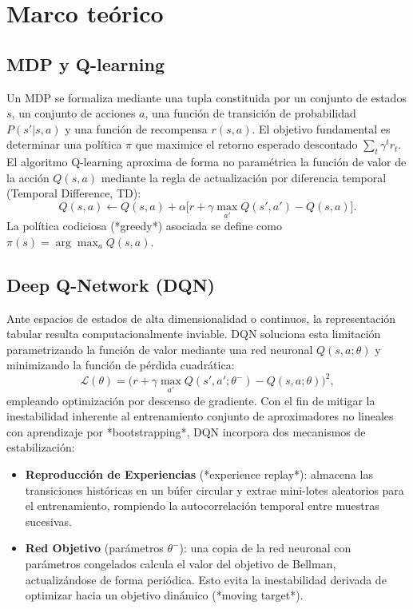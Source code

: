 \section{Marco teórico}
\label{sec:teoria}

\subsection{MDP y Q-learning}
Un MDP se formaliza mediante una tupla constituida por un conjunto de estados $s$, un conjunto de acciones $a$, una función de transición de probabilidad $P(s'|s,a)$ y una función de recompensa $r(s,a)$. El objetivo fundamental es determinar una política $\pi$ que maximice el retorno esperado descontado $\sum_t \gamma^t r_t$. El algoritmo Q-learning aproxima de forma no paramétrica la función de valor de la acción $Q(s,a)$ mediante la regla de actualización por diferencia temporal (Temporal Difference, TD):
\begin{equation}
Q(s,a) \leftarrow Q(s,a) + \alpha\big[r + \gamma \max_{a'} Q(s',a') - Q(s,a)\big].
\end{equation}
La política codiciosa (*greedy*) asociada se define como $\pi(s)=\arg\max_a Q(s,a)$.

\subsection{Deep Q-Network (DQN)}
Ante espacios de estados de alta dimensionalidad o continuos, la representación tabular resulta computacionalmente inviable. DQN \cite{mnih2015} soluciona esta limitación parametrizando la función de valor mediante una red neuronal $Q(s,a;\theta)$ y minimizando la función de pérdida cuadrática:
\begin{equation}
\mathcal{L}(\theta) = \big(r + \gamma \max_{a'} Q(s',a';\theta^-) - Q(s,a;\theta)\big)^2,
\end{equation}
empleando optimización por descenso de gradiente. Con el fin de mitigar la inestabilidad inherente al entrenamiento conjunto de aproximadores no lineales con aprendizaje por *bootstrapping*, DQN incorpora dos mecanismos de estabilización:
\begin{itemize}
  \item \textbf{Reproducción de Experiencias} (*experience replay*): almacena las transiciones históricas en un búfer circular y extrae mini-lotes aleatorios para el entrenamiento, rompiendo la autocorrelación temporal entre muestras sucesivas.
  \item \textbf{Red Objetivo} (parámetros $\theta^-$): una copia de la red neuronal con parámetros congelados calcula el valor del objetivo de Bellman, actualizándose de forma periódica. Esto evita la inestabilidad derivada de optimizar hacia un objetivo dinámico (*moving target*).
\end{itemize}

